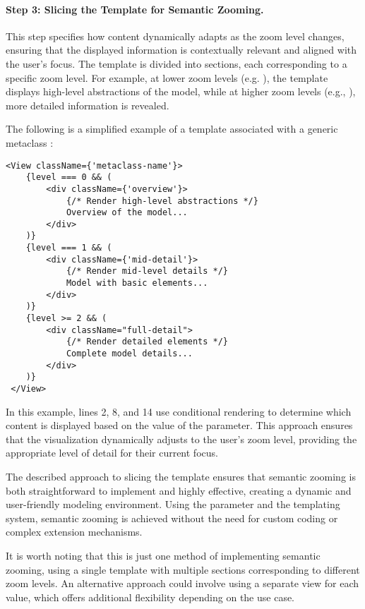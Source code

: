 \paragraph{Step 3: Slicing the Template for Semantic Zooming.} This step specifies how content dynamically adapts as the zoom level changes, ensuring that the displayed information is contextually relevant and aligned with the user’s focus. The template is divided into sections, each corresponding to a specific zoom level. For example, at lower zoom levels (e.g. ), the template displays high-level abstractions of the model, while at higher zoom levels (e.g., ), more detailed information is revealed.  

The following is a simplified example of a template associated with a generic metaclass :  

\begin{lstlisting}[language=JSX-template]  
 <View className={'metaclass-name'}>  
    {level === 0 && (  
        <div className={'overview'}>  
            {/* Render high-level abstractions */}  
            Overview of the model...  
        </div>  
    )}  
    {level === 1 && (  
        <div className={'mid-detail'}>  
            {/* Render mid-level details */}  
            Model with basic elements...  
        </div>  
    )}  
    {level >= 2 && (  
        <div className="full-detail">  
            {/* Render detailed elements */}  
            Complete model details...  
        </div>  
    )}  
 </View>  
\end{lstlisting}  

In this example, lines 2, 8, and 14 use conditional rendering to determine which content is displayed based on the value of the  parameter. This approach ensures that the visualization dynamically adjusts to the user’s zoom level, providing the appropriate level of detail for their current focus.  

The described approach to slicing the template ensures that semantic zooming is both straightforward to implement and highly effective, creating a dynamic and user-friendly modeling environment. Using the  parameter and the \jjodel{} templating system, semantic zooming is achieved without the need for custom coding or complex extension mechanisms.  

It is worth noting that this is just one method of implementing semantic zooming, using a single template with multiple sections corresponding to different zoom levels. An alternative approach could involve using a separate view for each  value, which offers additional flexibility depending on the use case.